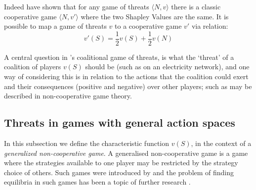 Indeed \cite{KOHLBERG2018139} have shown that for any game of threats $\langle N,v\rangle$ there is a classic cooperative game $\langle N,v'\rangle$ where the two Shapley Values are the same.
It is possible to map a game of threats $v$ to a cooperative game $v'$ via relation:
\begin{equation}\label{convert1}
v'(S)=\frac{1}{2}v(S)+\frac{1}{2}v(N)
\end{equation}

A central question in \cite{KOHLBERG2018139}'s coalitional game of threats, is what the `threat' of a coalition of players $v(S)$ should be (such as on an electricity network), and one way of considering this is in relation to the actions that the coalition could exert and their consequences (positive and negative) over other players; such as may be described in non-cooperative game theory.

\subsection{Threats in games with general action spaces}\label{the_value_def3}

In this subsection we define the characteristic function $v(S)$, in the context of a \textit{generalized non-cooperative game}.
A generalised non-cooperative game is a game where the strategies available to one player may be restricted by the strategy choice of others.
Such games were introduced by \cite{Debreu01101952} and the problem of finding equilibria in such games has been a topic of further research \citep{Facchinei2007,fischer2014}.

